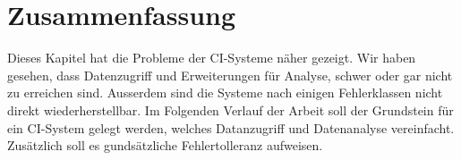 \section{Zusammenfassung}

Dieses Kapitel hat die Probleme der CI-Systeme n\"aher gezeigt.
Wir haben gesehen, dass Datenzugriff und Erweiterungen f\"ur Analyse,
schwer oder gar nicht zu erreichen sind.
Ausserdem sind die Systeme nach einigen Fehlerklassen nicht direkt wiederherstellbar.
Im Folgenden Verlauf der Arbeit soll der Grundstein f\"ur ein CI-System gelegt werden,
welches Datanzugriff und Datenanalyse vereinfacht.
Zus\"atzlich soll es gunds\"atzliche Fehlertolleranz aufweisen.


